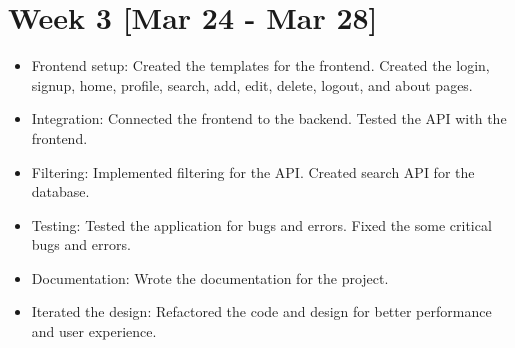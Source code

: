 \documentclass[11pt]{article}
\begin{document}
\section*{Week 3 [Mar 24 - Mar 28]}
\begin{itemize}
    \item Frontend setup: Created the templates for the frontend. Created the login, signup, home, profile, search, add, edit, delete, logout, and about pages.
    \item Integration: Connected the frontend to the backend. Tested the API with the frontend.
    \item Filtering: Implemented filtering for the API. Created search API for the database.
    \item Testing: Tested the application for bugs and errors. Fixed the some critical bugs and errors.
    \item Documentation: Wrote the documentation for the project.
    \item Iterated the design: Refactored the code and design for better performance and user experience.
\end{itemize}
\end{document}
